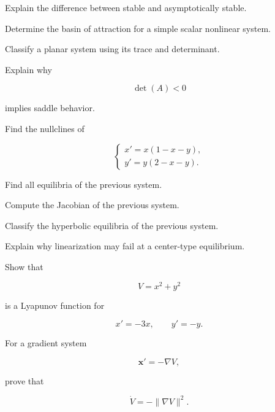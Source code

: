 \begin{exercise}[3]
Explain the difference between stable and asymptotically stable.
\end{exercise}

\begin{exercise}[3]
Determine the basin of attraction for a simple scalar nonlinear system.
\end{exercise}

\begin{exercise}[3]
Classify a planar system using its trace and determinant.
\end{exercise}

\begin{exercise}[3]
Explain why

\[
\det(A)<0
\]

implies saddle behavior.
\end{exercise}

\begin{exercise}[3]
Find the nullclines of

\[
\begin{cases}
x'=x(1-x-y),\\
y'=y(2-x-y).
\end{cases}
\]
\end{exercise}

\begin{exercise}[3]
Find all equilibria of the previous system.
\end{exercise}

\begin{exercise}[3]
Compute the Jacobian of the previous system.
\end{exercise}

\begin{exercise}[3]
Classify the hyperbolic equilibria of the previous system.
\end{exercise}

\begin{exercise}[3]
Explain why linearization may fail at a center-type equilibrium.
\end{exercise}

\begin{exercise}[3]
Show that

\[
V=x^2+y^2
\]

is a Lyapunov function for

\[
x'=-3x,
\qquad
y'=-y.
\]
\end{exercise}

\begin{exercise}[3]
For a gradient system

\[
\mathbf{x}'
=
-\nabla V,
\]

prove that

\[
\dot V
=
-
\|
\nabla V
\|^2.
\]
\end{exercise}

